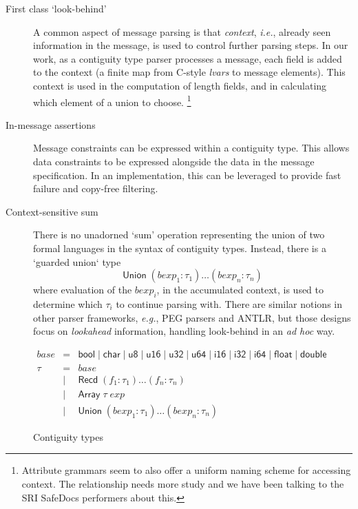 \documentclass{article}
\newcommand{\ie}{\textit{i.e.}}
\newcommand{\eg}{\textit{e.g.}}
\newcommand{\adhoc}{\textit{ad hoc}}
\newcommand{\konst}[1]{\ensuremath{\mathsf{#1}}}
\theoremstyle{definition}
\begin{document}
\begin{description}

\item [First class `look-behind'] A common aspect of message parsing
  is that \emph{context}, \ie, already seen information in the
  message, is used to control further parsing steps. In our work, as a
  contiguity type parser processes a message, each field is added to
  the context (a finite map from C-style \emph{lvars} to message
  elements). This context is used in the computation of length fields,
  and in calculating which element of a union to
  choose. \footnote{Attribute grammars seem to also offer a uniform
    naming scheme for accessing context. The relationship needs more
    study and we have been talking to the SRI SafeDocs performers
    about this.}

\item [In-message assertions] Message constraints can be expressed
  within a contiguity type. This allows data constraints to be
  expressed alongside the data in the message specification. In an
  implementation, this can be leveraged to provide fast failure and
  copy-free filtering.

\item [Context-sensitive sum] There is no unadorned `sum' operation
  representing the union of two formal languages in the syntax of
  contiguity types. Instead, there is a `guarded union` type
  \[
    \konst{Union}\; (\mathit{bexp}_1 : \tau_1) \ldots (\mathit{bexp}_n : \tau_n)
  \]
  where evaluation of the $\mathit{bexp}_i$, in the accumulated
  context, is used to determine which $\tau_i$ to continue parsing
  with. There are similar notions in other parser frameworks, \eg, PEG
  parsers and ANTLR, but those designs focus on \emph{lookahead}
  information, handling look-behind in an \adhoc{} way.

\end{description}


\begin{figure}
\[
\begin{array}{rcl}
 \mathit{base} & = & \konst{bool} \mid \konst{char} \mid \konst{u8} \mid
 \konst{u16} \mid \konst{u32} \mid \konst{u64}  \mid \konst{i16} \mid
 \konst{i32} \mid \konst{i64} \mid \konst{float} \mid \konst{double} \\
 \tau & = & \mathit{base} \\
      & \mid & \konst{Recd}\; (f_1 : \tau_1) \ldots (f_n : \tau_n) \\
      & \mid & \konst{Array}\; \tau \; \mathit{exp} \\
      & \mid & \konst{Union}\; (\mathit{bexp}_1 : \tau_1) \ldots (\mathit{bexp}_n : \tau_n)
\end{array}
\]
\caption{Contiguity types}
\label{ctypes}
\end{figure}
\end{document}
